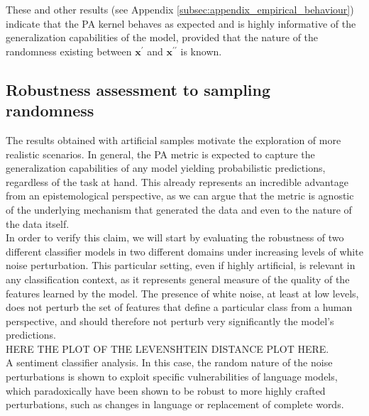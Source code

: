 These and other results (see Appendix \ref{subsec:appendix_empirical_behaviour}) indicate
that the PA kernel behaves as expected and is highly informative of the generalization
capabilities of the model, provided that the nature of the randomness existing
between $\bm{x}^\prime$ and $\bm{x}^{\prime \prime}$ is known.

\subsection{Robustness assessment to sampling randomness}

The results obtained with artificial samples motivate the exploration of more realistic
scenarios. In general, the PA metric is expected to capture the generalization capabilities
of any model yielding probabilistic predictions, regardless of the task at hand. This
already represents an incredible advantage from an epistemological perspective, as we
can argue that the metric is agnostic of the underlying mechanism that generated the data
and even to the nature of the data itself. \\

In order to verify this claim, we will start by evaluating the robustness of two
different classifier models in two different domains under increasing levels of 
white noise perturbation. This particular setting, even if highly artificial, is 
relevant in any classification context, as it represents general measure of the 
quality of the features learned by the model. The presence of white noise, at least 
at low levels, does not perturb the set of features that define a particular class from
a human perspective, and should therefore not perturb very significantly the
model's predictions. \\

HERE THE PLOT OF THE LEVENSHTEIN DISTANCE PLOT HERE. \\

A sentiment classifier analysis. In this case, the random nature of the noise perturbations
is shown to exploit specific vulnerabilities of language models, which paradoxically 
have been shown to be robust to more highly crafted perturbations, such as changes in
language or replacement of complete words. \\

